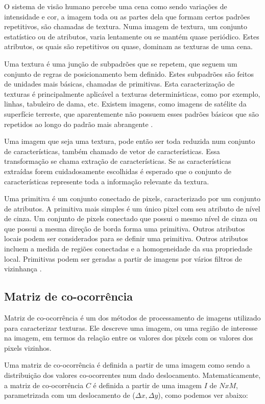 O sistema de visão humano percebe uma cena como sendo variações de intensidade e cor, a imagem toda ou as partes dela que formam certos padrões repetitivos, são chamadas de textura. Numa imagem de textura, um conjunto estatístico ou de atributos, varia lentamente ou se mantém quase periódico. Estes atributos, os quais são repetitivos ou quase, dominam as texturas de uma cena.

Uma textura é uma junção de subpadrões que se repetem, que seguem um conjunto de regras de posicionamento bem definido. Estes subpadrões são feitos de unidades mais básicas, chamadas de primitivas. Esta caracterização de texturas é principalmente aplicável a texturas determinísticas, como por exemplo, linhas, tabuleiro de dama, etc. Existem imagens, como imagens de satélite da superfície terreste, que aparentemente não possuem esses padrões básicos que são repetidos ao longo do padrão mais abrangente \cite{acharya}.

Uma imagem que seja uma textura, pode então ser toda reduzida num conjunto de características, também chamado de vetor de características. Essa transformação se chama extração de características. Se as características extraídas forem cuidadosamente escolhidas é esperado que o conjunto de características represente toda a informação relevante da textura.

Uma primitiva é um conjunto conectado de pixels, caracterizado por um conjunto de atributos. A primitiva mais simples é um único pixel com seu atributo de nível de cinza. Um conjunto de pixels conectado que possui o mesmo nível de cinza ou que possui a mesma direção de borda forma uma primitiva. Outros atributos locais podem ser considerados para se definir uma primitiva. Outros atributos incluem a medida de regiões conectadas e a homogeneidade da sua propriedade local. Primitivas podem ser geradas a partir de imagens por vários filtros de vizinhança \cite{acharya}.

\subsection{Matriz de co-ocorrência}

Matriz de co-ocorrência é um dos métodos de processamento de imagens utilizado para caracterizar texturas. Ele descreve uma imagem, ou uma região de interesse na imagem, em termos da relação entre os valores dos pixels com os valores dos pixels vizinhos.

Uma matriz de co-ocorrência é definida a partir de uma imagem como sendo a distribuição dos valores co-ocorrentes num dado deslocamento. Matematicamente, a matriz de co-ocorrência $C$ é definida a partir de uma imagem $I$ de $N x M$, parametrizada com um deslocamento de ($\Delta{}x,\Delta{}y$), como podemos ver abaixo:

